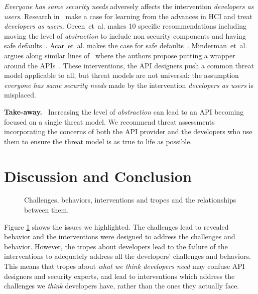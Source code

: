 \documentclass[conference]{IEEEtran}
\newenvironment{finding}{\begin{framed}\noindent\textbf{Take-away.}~}{\end{framed}}
\newcommand{\etal}[0]{et~al{.}}
\begin{document}
\emph{Everyone has same security needs} adversely affects the intervention \emph{developers as users}. Research in~\cite{rashid2019,acar2016} make a case for learning from the advances in \ac{HCI} and treat \emph{developers as users}. Green~\etal{} makes 10 specific recommendations including moving the level of \emph{abstraction} to include non security components and having safe defaults~\cite{smithgreen2016}. Acar~\etal{} makes the case for safe defaults~\cite{acarusability2017}. Minderman~\etal{} argues along similar lines of~\cite{smithgreen2016,acar2016} where the authors propose putting a wrapper around the APIs~\cite{mindermanrust2018}. These interventions, the API designers push a common threat model applicable to all, but threat models are not universal: the assumption \emph{everyone has same security needs} made by the intervention \emph{developers as users} is misplaced.  
\begin{finding}
\noindent  
Increasing the level of \emph{abstraction} can lead to an API becoming focused on a single  threat model. We recommend threat assessments incorporating the concerns of both the API provider and the developers who use them to ensure the threat model is as true to life as possible.
\end{finding}
%

\section{Discussion and Conclusion}
\begin{figure}
\centering
{}
\caption{Challenges, behaviors, interventions and tropes and the relationships between them.}
  \label{fig:circle}
\end{figure}

Figure \ref{fig:circle} shows the issues we highlighted. The challenges lead to revealed behavior and the interventions were designed to address the challenges and behavior. However, the tropes about developers lead to the failure of the interventions to adequately address all the developers' challenges and behaviors.  This means that tropes about \emph{what we think developers need} may confuse API designers and security experts, and lead to interventions which address the challenges we \emph{think} developers have, rather than the ones they actually face.
\end{document}

